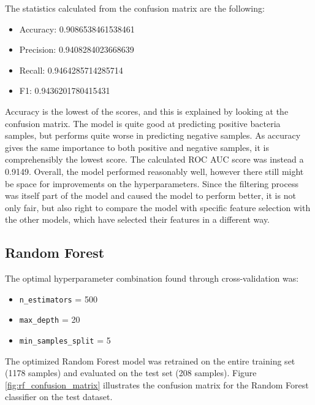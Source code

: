 \documentclass{article}
\begin{document}
The statistics calculated from the confusion matrix are the following: 
\begin{itemize}
  \item Accuracy:   0.9086538461538461
  \item Precision:   0.9408284023668639
  \item Recall:   0.9464285714285714
  \item F1:   0.9436201780415431
\end{itemize}
Accuracy is the lowest of the scores, and this is explained by looking at the confusion matrix. The model is quite good at predicting positive bacteria samples, but performs quite worse in predicting negative samples. As accuracy gives the same importance to both positive and negative samples, it is comprehensibly the lowest score. The calculated ROC AUC score was instead a 0.9149. Overall, the model performed reasonably well, however there still might be space for improvements on the hyperparameters.
Since the filtering process was itself part of the model and caused the model to perform better, it is not only fair, but also right to compare the model with specific feature selection with the other models, which have selected their features in a different way.

\subsection{Random Forest}

The optimal hyperparameter combination found through cross-validation was:
\begin{itemize}
    \item \texttt{n\_estimators} = 500
    \item \texttt{max\_depth} = 20
    \item \texttt{min\_samples\_split} = 5
\end{itemize}

The optimized Random Forest model was retrained on the entire training set (1178 samples) and evaluated on the test set (208 samples). Figure \ref{fig:rf_confusion_matrix} illustrates the confusion matrix for the Random Forest classifier on the test dataset.
\end{document}

